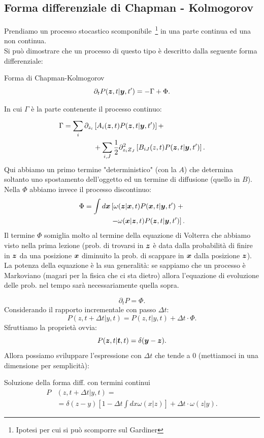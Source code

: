 \subsection{Forma differenziale di Chapman - Kolmogorov}%
\label{sub:Forma differenziale di Chapman - Kolmogorov}
Prendiamo un processo stocastico scomponibile\
\footnote{Ipotesi per cui si può scomporre sul Gardiner}  in una parte continua ed una non continua.\\
Si può dimostrare che un processo di questo tipo è descritto dalla seguente forma differenziale:
\begin{redbox}{Forma di Chapman-Kolmogorov}
 \[
    \partial_{t}P(\boldsymbol{z},t| \boldsymbol{y}, t') = - \Gamma + \Phi
.\]    
\end{redbox}
\noindent
In cui $\Gamma$ è la parte contenente il processo continuo:
\[\begin{aligned}
    \Gamma = \sum_{i}^{} \partial_{z_i}&\left[ A_i(\boldsymbol{z},t) P(\boldsymbol{z},t|\boldsymbol{y},t') \right] +\\
                         &+\sum_{i,J}^{} \frac{1}{2}\partial^2_{z_iZ_J}\left[ B_{iJ}(z,t) P(\boldsymbol{z},t|\boldsymbol{y},t') \right]
.\end{aligned}\]
Qui abbiamo un primo termine "deterministico" (con la $A$) che determina soltanto uno spostamento dell'oggetto ed un termine di diffusione (quello in $B$).\\
Nella $\Phi$ abbiamo invece il processo discontinuo:
\[\begin{aligned}
    \Phi = \int  d\boldsymbol{x} &\left[\omega (\boldsymbol{z}|\boldsymbol{x}, t) P(\boldsymbol{x},t|\boldsymbol{y}, t') \right. + \\
			   & \left. - \omega(\boldsymbol{x} | \boldsymbol{z}, t)  P(\boldsymbol{z},t|\boldsymbol{y},t') \right]
.\end{aligned}\]
Il termine $\Phi$ somiglia molto al termine della equazione di Volterra che abbiamo visto nella prima lezione (prob. di trovarsi in $\boldsymbol{z}$ è data dalla probabilità di finire in $\boldsymbol{z}$ da una posizione $\boldsymbol{x}$ diminuito la prob. di scappare in $\boldsymbol{x}$ dalla posizione $\boldsymbol{z}$).\\
La potenza della equazione è la sua generalità: se sappiamo che un processo è Markoviano (magari per la fisica che ci sta dietro) allora l'equazione di evoluzione delle prob. nel tempo sarà necessariamente quella sopra.
\begin{exmp}[$A=B=0$, quindi $\Gamma =0$]
    \[
        \partial_{t}P = \Phi
    .\] 
    Considerando il rapporto incrementale con passo $\Delta t$:
    \[
	P(z, t+\Delta t|y, t) = P(z,t|y,t) + \Delta t\cdot  \Phi
    .\] 
    Sfruttiamo la proprietà ovvia:
    \[
	P(\boldsymbol{z}, t|\boldsymbol{t}, t) = \delta (\boldsymbol{y}-\boldsymbol{z}) 
    .\] 
    Allora possiamo sviluppare l'espressione con $\Delta t$ che tende a $0$ (mettiamoci in una dimensione per semplicità):
    \begin{greenbox}{Soluzione della forma diff. con termini continui}
    \[\begin{aligned}
	P&(z, t + \Delta t| y, t) = \\
				  &= \delta (z-y) \left[1-\Delta t\int dx \omega (x|z) \right] + \Delta t \cdot \omega (z|y) 
    .\end{aligned}\]
    \end{greenbox}
    \noindent
\end{exmp}
